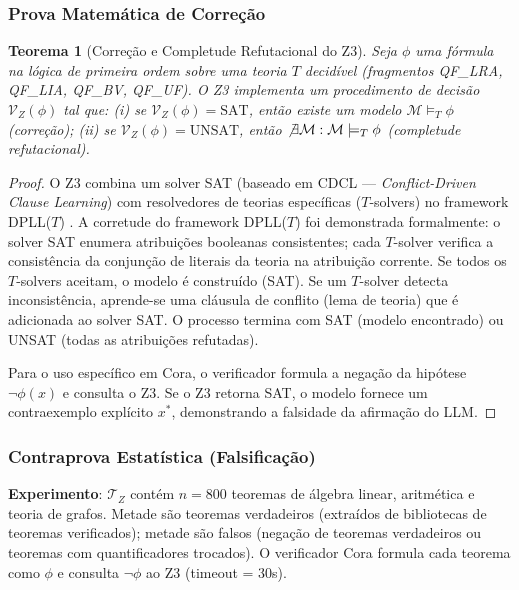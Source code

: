 \documentclass[5p]{elsarticle}
\newtheorem{theorem}{Teorema}[section]
\theoremstyle{remark}
\begin{document}
\subsubsection{Prova Matemática de Correção}

\begin{theorem}[Correção e Completude Refutacional do Z3]
Seja $\phi$ uma fórmula na lógica de primeira ordem sobre uma teoria $T$ decidível (fragmentos QF\_LRA, QF\_LIA, QF\_BV, QF\_UF). O Z3 implementa um procedimento de decisão $\mathcal{V}_Z(\phi)$ tal que: (i) se $\mathcal{V}_Z(\phi) = \text{SAT}$, então existe um modelo $\mathcal{M} \models_T \phi$ (correção); (ii) se $\mathcal{V}_Z(\phi) = \text{UNSAT}$, então $\not\exists \mathcal{M}: \mathcal{M} \models_T \phi$ (completude refutacional).
\end{theorem}

\begin{proof}
O Z3 combina um solver SAT (baseado em CDCL --- \textit{Conflict-Driven Clause Learning}) com resolvedores de teorias específicas ($T$-solvers) no framework DPLL($T$) \cite{Nieuwenhuis2006DPLLT}. A corretude do framework DPLL($T$) foi demonstrada formalmente: o solver SAT enumera atribuições booleanas consistentes; cada $T$-solver verifica a consistência da conjunção de literais da teoria na atribuição corrente. Se todos os $T$-solvers aceitam, o modelo é construído (SAT). Se um $T$-solver detecta inconsistência, aprende-se uma cláusula de conflito (lema de teoria) que é adicionada ao solver SAT. O processo termina com SAT (modelo encontrado) ou UNSAT (todas as atribuições refutadas).

Para o uso específico em Cora, o verificador formula a negação da hipótese $\neg\phi(x)$ e consulta o Z3. Se o Z3 retorna SAT, o modelo fornece um contraexemplo explícito $x^*$, demonstrando a falsidade da afirmação do LLM.
\end{proof}

\subsubsection{Contraprova Estatística (Falsificação)}

\textbf{Experimento}: $\mathcal{T}_Z$ contém $n = 800$ teoremas de álgebra linear, aritmética e teoria de grafos. Metade são teoremas verdadeiros (extraídos de bibliotecas de teoremas verificados); metade são falsos (negação de teoremas verdadeiros ou teoremas com quantificadores trocados). O verificador Cora formula cada teorema como $\phi$ e consulta $\neg\phi$ ao Z3 (timeout = 30s).
\end{document}
